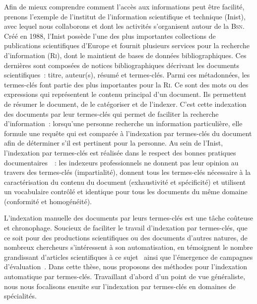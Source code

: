     Afin de mieux comprendre comment l'accès aux informations peut être
    facilité, prenons l'exemple de l'institut de l'information scientifique et
    technique (Inist), avec lequel nous collaborons et dont les activités
    s'organisent autour de la \textsc{Bsn}. Créé en 1988, l'Inist possède l'une
    des plus importantes collections de publications scientifiques d'Europe et
    fournit plusieurs services pour la recherche d'information (\textsc{Ri}),
    dont le maintient de bases de données bibliographiques. Ces dernières sont
    composées de notices bibliographiques décrivant les documents
    scientifiques~: titre, auteur(s), résumé et termes-clés. Parmi ces
    métadonnées, les termes-clés font partie des plus importantes pour la
    \textsc{Ri}. Ce sont des mots ou des expressions qui représentent le contenu
    principal d'un document. Ils permettent de résumer le document, de le
    catégoriser et de l'indexer. C'est cette indexation des documents par leur
    termes-clés qui permet de faciliter la recherche d'information~: lorsqu'une
    personne recherche un information particulière, elle formule une requête qui
    est comparée à l'indexation par termes-clés du document afin de déterminer
    s'il est pertinent pour la personne. Au sein de l'Inist, l'indexation par
    termes-clés est réalisée dans le respect des bonnes pratiques
    documentaires~\cite{guinchat1996techniquesdocumentaires}~: les indexeurs
    professionnels ne donnent pas leur opinion au travers des termes-clés
    (impartialité), donnent tous les termes-clés nécessaire à la caractérisation
    du contenu du document (exhaustivité et spécificité) et utilisent un
    vocabulaire contrôlé et identique pour tous les documents du même domaine
    (conformité et homogénéité). 

    L'indexation manuelle des documents par leurs termes-clés est une tâche
    coûteuse et chronophage. Soucieux de faciliter le travail d'indexation par
    termes-clés, que ce soit pour des productions scientifiques ou des documents
    d'autres natures, de nombreux chercheurs s'intéressent à son automatisation,
    en témoignent le nombre grandissant d'articles scientifiques à ce
    sujet~\cite{hasan2014state_of_the_art} ainsi que l'émergence de campagnes
    d'évaluation~\cite{kim2010semeval,paroubek2012deft}. Dans cette thèse, nous
    proposons des méthodes pour l'indexation automatique par termes-clés.
    Travaillant d'abord d'un point de vue généraliste, nous nous focalisons
    ensuite sur l'indexation par termes-clés en domaines de spécialités.

